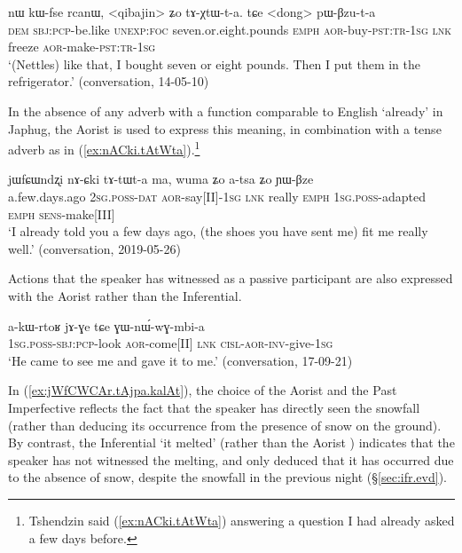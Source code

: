 \begin{exe}
\ex \label{ex:tAXtWta.pWBzuta}
 \gll nɯ kɯ-fse rcanɯ, <qibajin> ʑo tɤ-χtɯ-t-a. tɕe <dong> pɯ-βzu-t-a  \\
\textsc{dem} \textsc{sbj}:\textsc{pcp}-be.like \textsc{unexp}:\textsc{foc} seven.or.eight.pounds \textsc{emph} \textsc{aor}-buy-\textsc{pst}:\textsc{tr}-\textsc{1sg} \textsc{lnk} freeze \textsc{aor}-make-\textsc{pst}:\textsc{tr}-\textsc{1sg} \\
\glt `(Nettles) like that, I bought seven or eight pounds. Then I put them in the refrigerator.' (conversation, 14-05-10)
\end{exe}

In the absence of any adverb with a function comparable to English `already' in Japhug, the Aorist is used to express this meaning, in combination with a tense adverb as in (\ref{ex:nACki.tAtWta}).\footnote{Tshendzin said (\ref{ex:nACki.tAtWta}) answering a question I had already asked a few days before. }

\begin{exe}
\ex \label{ex:nACki.tAtWta}
 \gll jɯfɕɯndʐi nɤ-ɕki tɤ-tɯt-a ma, wuma ʑo a-tsa ʑo ɲɯ-βze  \\
 a.few.days.ago \textsc{2sg}.\textsc{poss}-\textsc{dat} \textsc{aor}-say[II]-\textsc{1sg} \textsc{lnk} really \textsc{emph} \textsc{1sg}.\textsc{poss}-adapted \textsc{emph} \textsc{sens}-make[III] \\
 \glt `I already told you a few days ago, (the shoes you have sent me) fit me really well.' (conversation, 2019-05-26)
\end{exe}

Actions that the speaker has witnessed as a passive participant are also expressed with the Aorist rather than the Inferential.

\begin{exe}
\ex \label{ex:jAGE.GWnWwGmbia}
 \gll a-kɯ-rtoʁ jɤ-ɣe tɕe ɣɯ-nɯ́-wɣ-mbi-a \\
 \textsc{1sg}.\textsc{poss}-\textsc{sbj}:\textsc{pcp}-look \textsc{aor}-come[II] \textsc{lnk} \textsc{cisl}-\textsc{aor}-\textsc{inv}-give-\textsc{1sg} \\
 \glt `He came to see me and gave it to me.' (conversation, 17-09-21)
\end{exe}

In (\ref{ex:jWfCWCAr.tAjpa.kalAt}), the choice of the Aorist  and the Past Imperfective  reflects the fact that the speaker has directly seen the snowfall (rather than deducing its occurrence from the presence of snow on the ground). By contrast, the Inferential  `it melted' (rather than the Aorist ) indicates that the speaker has not witnessed the melting, and only deduced that it has occurred due to the absence of snow, despite the snowfall in the previous night (§\ref{sec:ifr.evd}).

